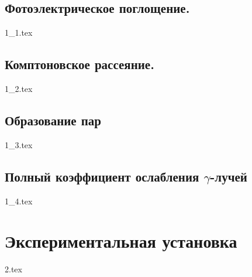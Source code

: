 \documentclass[a5paper, 10pt, twoside]{article} %
\begin{document}
  \subsection{Фотоэлектрическое поглощение.}
  {1_1.tex}

  \subsection{Комптоновское рассеяние.}
  {1_2.tex}

  \subsection{Образование пар}
  {1_3.tex}

  \subsection{Полный коэффициент ослабления $\gamma$-лучей}
  {1_4.tex}

\section{Экспериментальная установка}
{2.tex}
\end{document}
